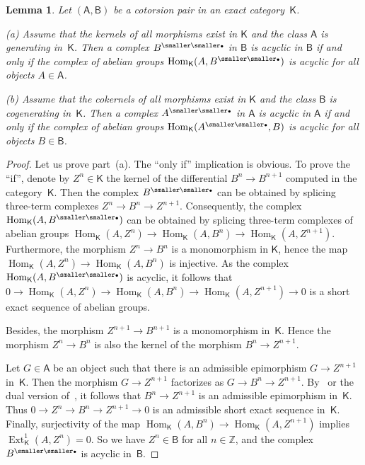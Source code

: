 \documentclass[12pt,a4paper]{amsart}
\newcommand{\+}{\nobreakdash-}
\renewcommand{\:}{\colon}
\newcommand{\rarrow}{\longrightarrow}
\newcommand{\bu}{{\text{\smaller\smaller$\scriptstyle\bullet$}}}
\DeclareMathOperator{\Hom}{Hom}
\DeclareMathOperator{\Ext}{Ext}
\newcommand{\sA}{\mathsf A}
\newcommand{\sB}{\mathsf B}
\newcommand{\sK}{\mathsf K}
\newcommand{\boZ}{\mathbb Z}
\theoremstyle{plain}
\newtheorem{lem}[thm]{Lemma}
\theoremstyle{definition}
\begin{document}
\begin{lem} \label{Hom-criterion-of-acyclicity-in-cotorsion-pair}
 Let $(\sA,\sB)$ be a cotorsion pair in an exact category\/~$\sK$. \par
\textup{(a)} Assume that the kernels of all morphisms exist in\/ $\sK$
and the class\/ $\sA$ is generating in\/~$\sK$.
 Then a complex $B^\bu$ in\/ $\sB$ is acyclic in\/ $\sB$ if and only
if the complex of abelian groups\/ $\Hom_\sK(A,B^\bu)$ is acyclic
for all objects $A\in\sA$. \par
\textup{(b)} Assume that the cokernels of all morphisms exist in\/ $\sK$
and the class\/ $\sB$ is cogenerating in\/~$\sK$.
 Then a complex $A^\bu$ in\/ $\sA$ is acyclic in\/ $\sA$ if and only
if the complex of abelian groups\/ $\Hom_\sK(A^\bu,B)$ is acyclic
for all objects $B\in\sB$.
\end{lem}

\begin{proof}
 Let us prove part~(a).
 The ``only if'' implication is obvious.
 To prove the ``if'', denote by $Z^n\in\sK$ the kernel of
the differential $B^n\rarrow B^{n+1}$ computed in the category~$\sK$.
 Then the complex $B^\bu$ can be obtained by splicing three-term
complexes $Z^n\rarrow B^n\rarrow Z^{n+1}$.
 Consequently, the complex $\Hom_\sK(A,B^\bu)$ can be obtained by
splicing three-term complexes of abelian groups $\Hom_\sK(A,Z^n)
\rarrow\Hom_\sK(A,B^n)\rarrow\Hom_\sK(A,Z^{n+1})$.
 Furthermore, the morphism $Z^n\rarrow B^n$ is a monomorphism in $\sK$,
hence the map $\Hom_\sK(A,Z^n)\rarrow\Hom_\sK(A,B^n)$ is injective.
 As the complex $\Hom_\sK(A,B^\bu)$ is acyclic, it follows that
$0\rarrow\Hom_\sK(A,Z^n)\rarrow\Hom_\sK(A,B^n)\rarrow\Hom_\sK(A,Z^{n+1})
\rarrow0$ is a short exact sequence of abelian groups.

 Besides, the morphism $Z^{n+1}\rarrow B^{n+1}$ is a monomorphism
in~$\sK$.
 Hence the morphism $Z^n\rarrow B^n$ is also the kernel of
the morphism $B^n\rarrow Z^{n+1}$.

 Let $G\in\sA$ be an object such that there is an admissible
epimorphism $G\rarrow Z^{n+1}$ in~$\sK$.
 Then the morphism $G\rarrow Z^{n+1}$ factorizes as $G\rarrow B^n
\rarrow Z^{n+1}$.
 By~\cite[Proposition~7.6]{Bueh} or the dual version
of~\cite[Proposition~2.16]{Bueh}, it follows that $B^n\rarrow Z^{n+1}$
is an admissible epimorphism in~$\sK$.
 Thus $0\rarrow Z^n\rarrow B^n\rarrow Z^{n+1}\rarrow0$ is an admissible
short exact sequence in~$\sK$.
 Finally, surjectivity of the map $\Hom_\sK(A,B^n)\rarrow
\Hom_\sK(A,Z^{n+1})$ implies $\Ext^1_\sK(A,Z^n)=0$.
 So we have $Z^n\in\sB$ for all $n\in\boZ$, and the complex $B^\bu$
is acyclic in~$\sB$.
\end{proof}
\end{document}
